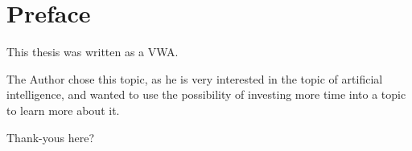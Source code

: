 \chapter{Preface}
This thesis was written as a VWA.

The Author chose this topic, as he is very interested in the topic of artificial intelligence, and wanted to use the possibility of investing more time into a topic to learn more about it.

Thank-yous here?